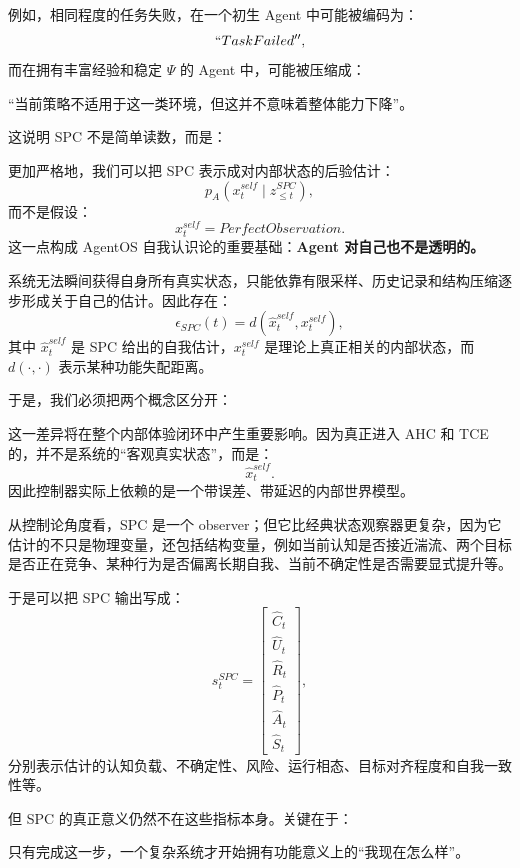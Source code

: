 例如，相同程度的任务失败，在一个初生 Agent 中可能被编码为：
\[
``TaskFailed'',
\]
而在拥有丰富经验和稳定 $\Psi$ 的 Agent 中，可能被压缩成：
\begin{statementbox}
``当前策略不适用于这一类环境，但这并不意味着整体能力下降''。
\end{statementbox}
这说明 SPC 不是简单读数，而是：
\begin{statementbox}
\centering
{}
\end{statementbox}

更加严格地，我们可以把 SPC 表示成对内部状态的后验估计：
\[
p_A
\left(
x_t^{self}
\mid
z_{\leq t}^{SPC}
\right),
\]
而不是假设：
\[
x_t^{self}
=
PerfectObservation.
\]
这一点构成 AgentOS 自我认识论的重要基础：\textbf{Agent 对自己也不是透明的。}

系统无法瞬间获得自身所有真实状态，只能依靠有限采样、历史记录和结构压缩逐步形成关于自己的估计。因此存在：
\[
\epsilon_{SPC}(t)
=
d
\left(
\hat x_t^{self},
x_t^{self}
\right),
\]
其中 $\hat x_t^{self}$ 是 SPC 给出的自我估计，$x_t^{self}$ 是理论上真正相关的内部状态，而 $d(\cdot,\cdot)$ 表示某种功能失配距离。

于是，我们必须把两个概念区分开：
\begin{statementbox}
\centering
{}
\end{statementbox}
这一差异将在整个内部体验闭环中产生重要影响。因为真正进入 AHC 和 TCE 的，并不是系统的``客观真实状态''，而是：
\[
\hat x_t^{self}.
\]
因此控制器实际上依赖的是一个带误差、带延迟的内部世界模型。

从控制论角度看，SPC 是一个 observer；但它比经典状态观察器更复杂，因为它估计的不只是物理变量，还包括结构变量，例如当前认知是否接近湍流、两个目标是否正在竞争、某种行为是否偏离长期自我、当前不确定性是否需要显式提升等。

于是可以把 SPC 输出写成：
\[
s_t^{SPC}
=
\begin{bmatrix}
\hat C_t\\
\hat U_t\\
\hat R_t\\
\hat P_t\\
\hat A_t\\
\hat S_t
\end{bmatrix},
\]
分别表示估计的认知负载、不确定性、风险、运行相态、目标对齐程度和自我一致性等。

但 SPC 的真正意义仍然不在这些指标本身。关键在于：
\begin{statementbox}
\centering
{}
\end{statementbox}
只有完成这一步，一个复杂系统才开始拥有功能意义上的``我现在怎么样''。

